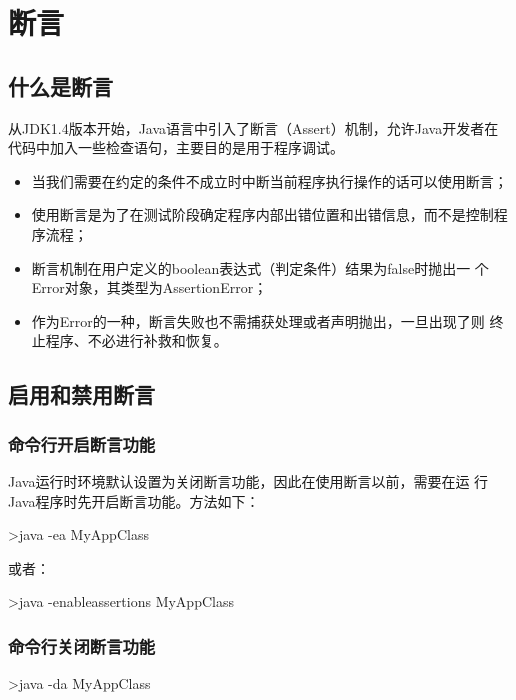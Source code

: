 \section{断言}

\subsection{什么是断言}

从JDK1.4版本开始，Java语言中引入了断言（Assert）机制，允许Java开发者在
代码中加入一些检查语句，主要目的是用于程序调试。

\begin{itemize}
\item 当我们需要在约定的条件不成立时中断当前程序执行操作的话可以使用断言；
\item 使用断言是为了在测试阶段确定程序内部出错位置和出错信息，而不是控制程序流程；
\item 断言机制在用户定义的boolean表达式（判定条件）结果为false时抛出一
  个Error对象，其类型为AssertionError；
\item 作为Error的一种，断言失败也不需捕获处理或者声明抛出，一旦出现了则
  终止程序、不必进行补救和恢复。

\end{itemize}

\subsection{启用和禁用断言}

\subsubsection{命令行开启断言功能}

Java运行时环境默认设置为关闭断言功能，因此在使用断言以前，需要在运
行Java程序时先开启断言功能。方法如下：

\begin{shCode}
>java -ea MyAppClass
\end{shCode}

或者：

\begin{shCode}
>java -enableassertions MyAppClass  
\end{shCode}

\subsubsection{命令行关闭断言功能}

\begin{shCode}
>java -da MyAppClass  
\end{shCode}

